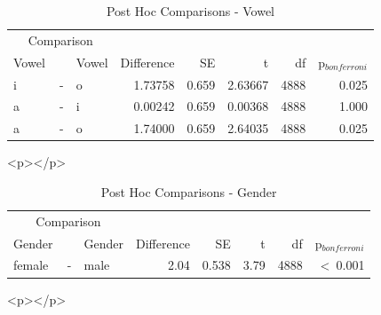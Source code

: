 \documentclass[a4paper,man,hidelinks,floatsintext]{apa7}
\begin{document}
    
\begin{table}[!htbp]
\caption{Post Hoc Comparisons - Vowel}
\label{tab:Table_7}
\begin{adjustbox}{max size={\columnwidth}{\textheight}}
\centering
\begin{tabular}{lrlrrrrr}
\hline
\multicolumn{3}{c}{Comparison} & \multicolumn{5}{c}{~} \\
\cline{1-3}
Vowel & ~ & Vowel & Difference &    SE &       t &   df & p$_{bonferroni}$ \\
\hline
i     & - & o     &    1.73758 & 0.659 & 2.63667 & 4888 &            0.025 \\
a     & - & i     &    0.00242 & 0.659 & 0.00368 & 4888 &            1.000 \\
a     & - & o     &    1.74000 & 0.659 & 2.64035 & 4888 &            0.025 \\
\hline
\end{tabular}
\end{adjustbox}
\begin{tablenotes} {
\small
}
\end{tablenotes}
\end{table}
      
        <p></p>
      
    
\begin{table}[!htbp]
\caption{Post Hoc Comparisons - Gender}
\label{tab:Table_8}
\begin{adjustbox}{max size={\columnwidth}{\textheight}}
\centering
\begin{tabular}{lrlrrrrr}
\hline
\multicolumn{3}{c}{Comparison} & \multicolumn{5}{c}{~} \\
\cline{1-3}
Gender & ~ & Gender & Difference &    SE &    t &   df & p$_{bonferroni}$ \\
\hline
female & - & male   &       2.04 & 0.538 & 3.79 & 4888 &  \textless~0.001 \\
\hline
\end{tabular}
\end{adjustbox}
\begin{tablenotes} {
\small
}
\end{tablenotes}
\end{table}
      
        <p></p>
      
\end{document}
